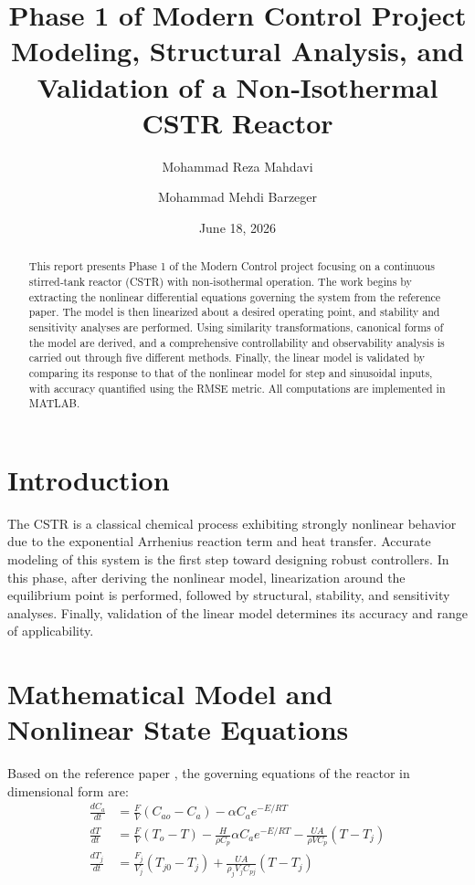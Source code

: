 \documentclass[12pt,a4paper]{article}
\title{Phase 1 of Modern Control Project \\
       Modeling, Structural Analysis, and Validation of a Non‑Isothermal CSTR Reactor}
\author{Mohammad Reza Mahdavi \and Mohammad Mehdi Barzeger}
\date{June 18, 2026}
\begin{document}
\maketitle

\begin{abstract}
This report presents Phase 1 of the Modern Control project focusing on a continuous stirred‑tank reactor (CSTR) with non‑isothermal operation. The work begins by extracting the nonlinear differential equations governing the system from the reference paper. The model is then linearized about a desired operating point, and stability and sensitivity analyses are performed. Using similarity transformations, canonical forms of the model are derived, and a comprehensive controllability and observability analysis is carried out through five different methods. Finally, the linear model is validated by comparing its response to that of the nonlinear model for step and sinusoidal inputs, with accuracy quantified using the RMSE metric. All computations are implemented in MATLAB.
\end{abstract}

\section{Introduction}
The CSTR is a classical chemical process exhibiting strongly nonlinear behavior due to the exponential Arrhenius reaction term and heat transfer. Accurate modeling of this system is the first step toward designing robust controllers. In this phase, after deriving the nonlinear model, linearization around the equilibrium point is performed, followed by structural, stability, and sensitivity analyses. Finally, validation of the linear model determines its accuracy and range of applicability.

\section{Mathematical Model and Nonlinear State Equations}
Based on the reference paper \cite{perez}, the governing equations of the reactor in dimensional form are:
\begin{align}
\frac{dC_a}{dt} &= \frac{F}{V}(C_{ao}-C_a) - \alpha C_a e^{-E/RT} \label{eq:ca}\\
\frac{dT}{dt}   &= \frac{F}{V}(T_o-T) - \frac{H}{\rho C_p}\alpha C_a e^{-E/RT} - \frac{UA}{\rho V C_p}(T-T_j) \label{eq:T}\\
\frac{dT_j}{dt} &= \frac{F_j}{V_j}(T_{j0}-T_j) + \frac{UA}{\rho_j V_j C_{pj}}(T-T_j) \label{eq:Tj}
\end{align}
\end{document}
